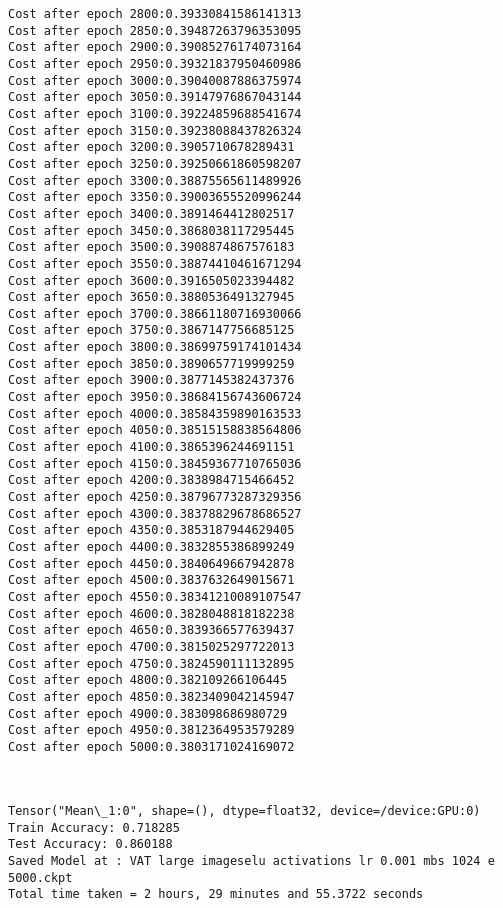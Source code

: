 \documentclass[11pt]{article}
\begin{document}
\begin{Verbatim}[commandchars=\\\{\}]
Cost after epoch 2800:0.39330841586141313
Cost after epoch 2850:0.39487263796353095
Cost after epoch 2900:0.39085276174073164
Cost after epoch 2950:0.39321837950460986
Cost after epoch 3000:0.39040087886375974
Cost after epoch 3050:0.39147976867043144
Cost after epoch 3100:0.39224859688541674
Cost after epoch 3150:0.39238088437826324
Cost after epoch 3200:0.3905710678289431
Cost after epoch 3250:0.39250661860598207
Cost after epoch 3300:0.38875565611489926
Cost after epoch 3350:0.39003655520996244
Cost after epoch 3400:0.3891464412802517
Cost after epoch 3450:0.3868038117295445
Cost after epoch 3500:0.3908874867576183
Cost after epoch 3550:0.38874410461671294
Cost after epoch 3600:0.3916505023394482
Cost after epoch 3650:0.3880536491327945
Cost after epoch 3700:0.38661180716930066
Cost after epoch 3750:0.3867147756685125
Cost after epoch 3800:0.38699759174101434
Cost after epoch 3850:0.3890657719999259
Cost after epoch 3900:0.3877145382437376
Cost after epoch 3950:0.38684156743606724
Cost after epoch 4000:0.38584359890163533
Cost after epoch 4050:0.38515158838564806
Cost after epoch 4100:0.3865396244691151
Cost after epoch 4150:0.38459367710765036
Cost after epoch 4200:0.3838984715466452
Cost after epoch 4250:0.38796773287329356
Cost after epoch 4300:0.38378829678686527
Cost after epoch 4350:0.3853187944629405
Cost after epoch 4400:0.3832855386899249
Cost after epoch 4450:0.3840649667942878
Cost after epoch 4500:0.3837632649015671
Cost after epoch 4550:0.38341210089107547
Cost after epoch 4600:0.3828048818182238
Cost after epoch 4650:0.3839366577639437
Cost after epoch 4700:0.3815025297722013
Cost after epoch 4750:0.3824590111132895
Cost after epoch 4800:0.382109266106445
Cost after epoch 4850:0.3823409042145947
Cost after epoch 4900:0.383098686980729
Cost after epoch 4950:0.3812364953579289
Cost after epoch 5000:0.3803171024169072

    \end{Verbatim}

    \begin{center}
    \end{center}
    { \hspace*{\fill} \\}
    
    \begin{Verbatim}[commandchars=\\\{\}]
Tensor("Mean\_1:0", shape=(), dtype=float32, device=/device:GPU:0)
Train Accuracy: 0.718285
Test Accuracy: 0.860188
Saved Model at : VAT large imageselu activations lr 0.001 mbs 1024 e 5000.ckpt
Total time taken = 2 hours, 29 minutes and 55.3722 seconds

    \end{Verbatim}
\end{document}
